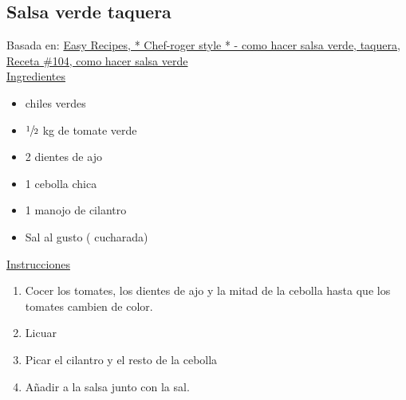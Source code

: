 \subsection{Salsa verde taquera}

Basada en: \href{https://www.youtube.com/watch?v=sSBfWMCO508}{Easy Recipes, * Chef-roger style *
 - como hacer salsa verde, taquera, Receta \#104, como hacer salsa verde} \\

\underline{Ingredientes}
\begin{itemize}
\item {} chiles verdes
\item $\sfrac{1}{2}$ kg de tomate verde
\item 2 dientes de ajo
\item 1 cebolla chica
\item 1 manojo de cilantro
\item Sal al gusto ( cucharada)
\end{itemize}

\underline{Instrucciones}
\begin{enumerate}
\item Cocer los tomates, los dientes de ajo y la mitad de la cebolla hasta que los tomates cambien de color.
\item Licuar
\item Picar el cilantro y el resto de la cebolla
\item Añadir a la salsa junto con la sal.
\end{enumerate}
